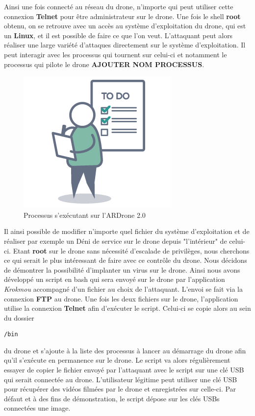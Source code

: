 Ainsi une fois connecté au réseau du drone, n'importe qui peut utiliser cette connexion \textbf{Telnet} pour être administrateur sur le drone. Une fois le shell \textbf{root} obtenu, on se retrouve avec un accès au système d'exploitation du drone, qui est un \textbf{Linux}, et il est possible de faire ce que l'on veut. L'attaquant peut alors réaliser une large variété d'attaques directement sur le système d'exploitation. Il peut interagir avec les processus qui tournent sur celui-ci et notamment le processus qui pilote le drone \textbf{AJOUTER NOM PROCESSUS}.

\begin{figure}[H]
  \centering
  \includegraphics[scale=0.3]{images/todo.png}
  \caption{Processus s'exécutant sur l'ARDrone 2.0}
\end{figure}

Il ainsi possible de modifier n'importe quel fichier du système d'exploitation et de réaliser par exemple un Déni de service sur le drone depuis "l'intérieur" de celui-ci. Etant \textbf{root} sur le drone sans nécessité d'escalade de privilèges, nous cherchons ce qui serait le plus intéressant de faire avec ce contrôle du drone. Nous décidons de démontrer la possibilité d'implanter un virus sur le drone. Ainsi nous avons développé un script en bash qui sera envoyé sur le drone par l'application \textit{Krokmou} accompagné d'un fichier au choix de l'attaquant. L'envoi se fait via la connexion \textbf{FTP} au drone. Une fois les deux fichiers sur le drone, l'application utilise la connexion \textbf{Telnet} afin d'exécuter le script. Celui-ci se copie alors au sein du dossier \begin{verbatim}/bin\end{verbatim} du drone et s'ajoute à la liste des processus à lancer au démarrage du drone afin qu'il s'exécute en permanence sur le drone. Le script va alors régulièrement essayer de copier le fichier envoyé par l'attaquant avec le script sur une clé USB qui serait connectée au drone. L'utilisateur légitime peut utiliser une clé USB pour récupérer des vidéos filmées par le drone et enregistrées sur celle-ci. Par défaut et à des fins de démonstration, le script dépose sur les clés USBs connectées une image.

